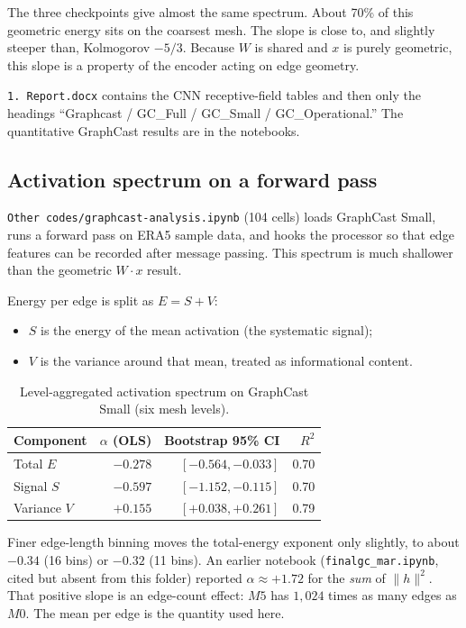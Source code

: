 \documentclass[11pt,a4paper]{article}
\begin{document}
The three checkpoints give almost the same spectrum.
About 70\% of this geometric energy sits on the coarsest mesh.
The slope is close to, and slightly steeper than, Kolmogorov \(-5/3\).
Because \(W\) is shared and \(x\) is purely geometric, this slope is a property of the encoder acting on edge geometry.

\texttt{1.~Report.docx} contains the CNN receptive-field tables and then only the headings ``Graphcast / GC\_Full / GC\_Small / GC\_Operational.''
The quantitative GraphCast results are in the notebooks.

\subsection{Activation spectrum on a forward pass}

\texttt{Other codes/graphcast-analysis.ipynb} (104 cells) loads GraphCast Small, runs a forward pass on ERA5 sample data, and hooks the processor so that edge features can be recorded after message passing.
This spectrum is much shallower than the geometric \(W\cdot x\) result.

Energy per edge is split as \(E = S + V\):
\begin{itemize}
  \item \(S\) is the energy of the mean activation (the systematic signal);
  \item \(V\) is the variance around that mean, treated as informational content.
\end{itemize}

\begin{table}[ht]
  \centering
  \caption{Level-aggregated activation spectrum on GraphCast Small (six mesh levels).}
  \label{tab:gc-act}
  \begin{tabular}{lrrr}
    \toprule
    Component & \(\alpha\) (OLS) & Bootstrap 95\% CI & \(R^2\) \\
    \midrule
    Total \(E\)   & \(-0.278\) & \([-0.564,-0.033]\) & 0.70 \\
    Signal \(S\)  & \(-0.597\) & \([-1.152,-0.115]\) & 0.70 \\
    Variance \(V\) & \(+0.155\) & \([+0.038,+0.261]\) & 0.79 \\
    \bottomrule
  \end{tabular}
\end{table}

Finer edge-length binning moves the total-energy exponent only slightly, to about \(-0.34\) (16 bins) or \(-0.32\) (11 bins).
An earlier notebook (\texttt{finalgc\_mar.ipynb}, cited but absent from this folder) reported \(\alpha \approx +1.72\) for the \emph{sum} of \(\|h\|^2\).
That positive slope is an edge-count effect: \(M5\) has \(1{,}024\) times as many edges as \(M0\).
The mean per edge is the quantity used here.
\end{document}
